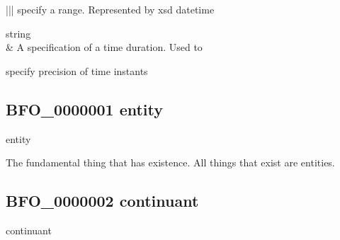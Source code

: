 \documentclass[letterpaper,10pt,english]{sphinxmanual}
\begin{document}
\begin{savenotes}
\begin{longtable}[c]{|*{2}{|}}
\sphinxAtStartPar
specify a range.  Represented by xsd datetime

\sphinxAtStartPar
string
\\
\hline
\sphinxAtStartPar
{\hyperref[\detokenize{doc-TemporalUnit::doc}]{}}
&
\sphinxAtStartPar
A specification of a time duration.  Used to

\sphinxAtStartPar
specify precision of time instants
\\
\hline
\end{longtable}\sphinxatlongtableend\end{savenotes}
\begin{quote}

\ignorespaces \end{quote}


\subsection{BFO\_0000001 \sphinxhyphen{} entity}
\label{\detokenize{doc-BFO_0000001:bfo-0000001-entity}}\label{\detokenize{doc-BFO_0000001:index-0}}\label{\detokenize{doc-BFO_0000001::doc}}
\begin{sphinxShadowBox}

\sphinxAtStartPar
entity
\end{sphinxShadowBox}

\begin{sphinxShadowBox}

\sphinxAtStartPar
The fundamental thing that has existence. All things that exist are entities.
\end{sphinxShadowBox}

\begin{sphinxShadowBox}

\sphinxAtStartPar
{}
\end{sphinxShadowBox}
\begin{quote}

\ignorespaces \end{quote}


\subsection{BFO\_0000002 \sphinxhyphen{} continuant}
\label{\detokenize{doc-BFO_0000002:bfo-0000002-continuant}}\label{\detokenize{doc-BFO_0000002:index-0}}\label{\detokenize{doc-BFO_0000002::doc}}
\begin{sphinxShadowBox}

\sphinxAtStartPar
continuant
\end{sphinxShadowBox}
\end{document}

